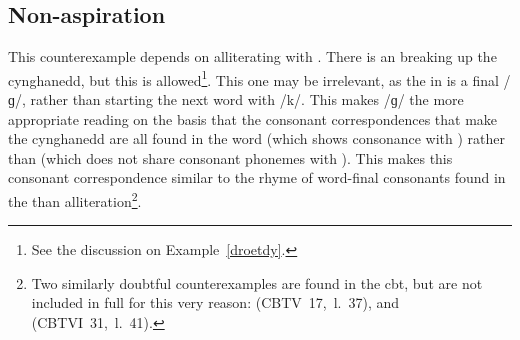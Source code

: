 \subsection{Non-aspiration}
This counterexample depends on  alliterating with . There is an  breaking up the cynghanedd, but this is allowed\footnote{See the discussion on Example~\ref{droetdy}.}. 
This one may be irrelevant, as the  in  is a final /ɡ/, rather than starting the next word with /k/. This makes /ɡ/  the more appropriate reading on the basis that the consonant correspondences that make the cynghanedd are all found in the word  (which shows consonance with ) rather than  (which does not share consonant phonemes with ). This makes this consonant correspondence similar to the rhyme of word-final consonants found in the  than alliteration\footnote{Two similarly doubtful counterexamples are found in the \gls{cbt}, but are not included in full for this very reason:  (\acrshort{CBTV}~17,~l.~37), and  (\acrshort{CBTVI}~31,~l.~41).}. 
